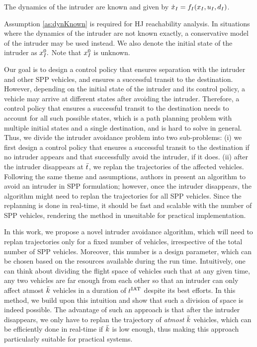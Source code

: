 \begin{assumption}
\label{as:dynKnown}
The dynamics of the intruder are known and given by $\dot{x}_I = f_I(x_I, u_I, d_I)$.
\end{assumption}

Assumption \ref{as:dynKnown} is required for HJ reachability analysis. In situations where the dynamics of the intruder are not known exactly, a conservative model of the intruder may be used instead. We also denote the initial state of the intruder as $x_{I}^0.$ Note that $x_{I}^0$ is unknown.

Our goal is to design a control policy that ensures separation with the intruder and other SPP vehicles, and ensures a successful transit to the destination. However, depending on the initial state of the intruder and its control policy, a vehicle may arrive at different states after avoiding the intruder. Therefore, a control policy that ensures a successful transit to the destination needs to account for all such possible states, which is a path planning problem with multiple initial states and a single destination, and is hard to solve in general. Thus, we divide the intruder avoidance problem into two sub-problems: (i) we first design a control policy that ensures a successful transit to the destination if no intruder appears and that successfully avoid the intruder, if it does. (ii) after the intruder disappears at $\bar{t}$, we replan the trajectories of the affected vehicles. Following the same theme and assumptions, authors in \cite{chen2016robust} present an algorithm to avoid an intruder in SPP formulation; however, once the intruder disappears, the algorithm might need to replan the trajectories for all SPP vehicles. Since the replanning is done in real-time, it should be fast and scalable with the number of SPP vehicles, rendering the method in \cite{chen2016robust} unsuitable for practical implementation.  

In this work, we propose a novel intruder avoidance algorithm, which will need to replan trajectories only for a fixed number of vehicles, irrespective of the total number of SPP vehicles. Moreover, this number is a design parameter, which can be chosen based on the resources available during the run time. Intuitively, one can think about dividing the flight space of vehicles such that at any given time, any two vehicles are far enough from each other so that an intruder can only affect atmost $\bar{k}$ vehicles in a duration of $t^\text{IAT}$ despite its best efforts. In this method, we build upon this intuition and show that such a division of space is indeed possible. The advantage of such an approach is that after the intruder disappears, we only have to replan the trajectory of \textit{atmost $\bar{k}$} vehicles, which can be efficiently done in real-time if $\bar{k}$ is low enough, thus making this approach particularly suitable for practical systems. %

